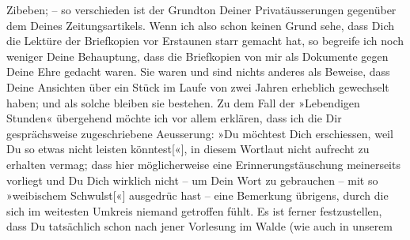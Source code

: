 \begin{ledgroupsized}[t]{13cm}
{                  Zibeben}{}\label{K_L03521-2h}; – so verschieden ist der
               Grundton Deiner Privatäusserungen gegenüber dem Deines Zeitungsartikels. Wenn ich also schon
               keinen Grund sehe, dass Dich die Lektüre der Briefkopien vor Erstaunen starr gemacht
               hat, so begreife ich noch weniger Deine Behauptung, dass die Briefkopien von mir als
               Dokumente gegen Deine Ehre gedacht waren. Sie waren und sind nichts anderes als
               Beweise, dass Deine Ansichten über ein Stück im Laufe von zwei Jahren erheblich gewechselt haben;
               und als solche bleiben sie bestehen.\pend
           \pstart
           Zu dem Fall der »Lebendigen Stunden« übergehend
               möchte ich vor allem erklären, dass ich die Dir ge{\pb}sprächsweise zugeschriebene
               Aeusserung: »Du möchtest Dich erschiessen, weil Du so etwas nicht leisten
                  könntest{[}«{]}, in diesem Wortlaut nicht aufrecht zu erhalten
               vermag; dass hier möglicherweise eine Erinnerungstäuschung meinerseits vorliegt und
               Du Dich wirklich nicht – um Dein Wort zu gebrauchen – mit so »weibischem
                  Schwulst{[}«{]} ausgedrüc hast – eine Bemerkung übrigens, durch die sich im weitesten Umkreis niemand
               getroffen fühlt. Es ist ferner festzustellen, dass Du tatsächlich schon nach jener
                  Vorlesung im Walde (wie auch in unserem

\end{ledgroupsized}
